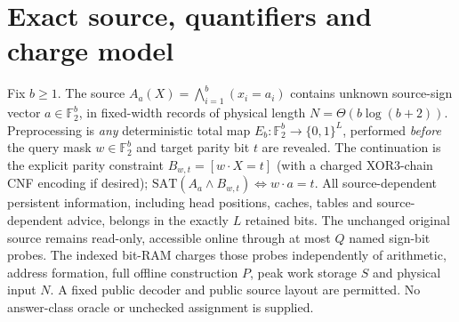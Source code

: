 \documentclass[10pt]{article}
\begin{document}
\section{Exact source, quantifiers and charge model}
Fix $b\ge1$. The source $A_a(X)=\bigwedge_{i=1}^b(x_i=a_i)$
contains unknown source-sign vector $a\in\mathbb F_2^b$, in fixed-width
records of physical length $N=\Theta(b\log(b+2))$.
Preprocessing is \emph{any} deterministic total map
$E_b:\mathbb F_2^b\to\{0,1\}^L$, performed \emph{before}
the query mask $w\in\mathbb F_2^b$ and target parity bit $t$ are revealed.
The continuation is the explicit parity constraint $B_{w,t}=[w\cdot X=t]$
(with a charged XOR3-chain CNF encoding if desired);
$\mathrm{SAT}(A_a\wedge B_{w,t})\iff w\cdot a=t$.
All source-dependent persistent information, including head positions,
caches, tables and source-dependent advice, belongs in the exactly $L$
retained bits. The unchanged original source remains read-only,
accessible online through at most $Q$ named sign-bit probes.
The indexed bit-RAM charges those probes independently of arithmetic,
address formation, full offline construction $P$, peak work storage $S$
and physical input $N$. A fixed public decoder and public source layout
are permitted. No answer-class oracle or unchecked assignment is supplied.
\end{document}
